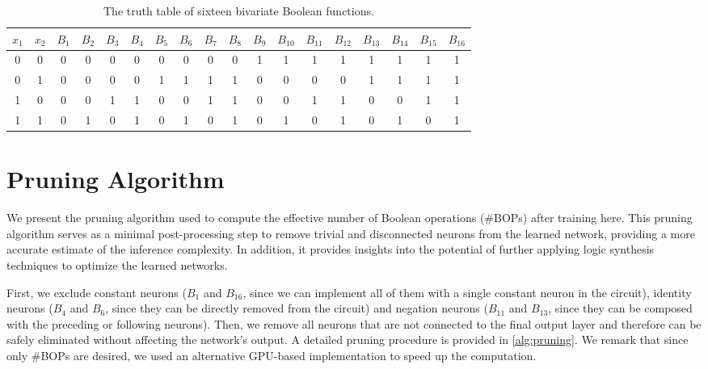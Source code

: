 \begin{table}[!htbp]
\centering
\caption{The truth table of sixteen bivariate Boolean functions.} \label{tb:all_two_input_boo_fun}
\begin{tabular}{|c|c||*{16}{c|}}
\hline
$x_1$ & $x_2$  & $B_1$ & $B_2$ & $B_3$ & $B_4$ & $B_5$ & $B_6$ & $B_7$ &
$B_8$ & $B_9$ & $B_{10}$ & $B_{11}$ & $B_{12}$ & $B_{13}$ & $B_{14}$ & $B_{15}$ & $B_{16}$ \\
\hline\hline
0 & 0 & 0 & 0 & 0 & 0 & 0 & 0 & 0 & 0 & 1 & 1 & 1 & 1 & 1 & 1 & 1 & 1 \\
\hline
0 & 1 & 0 & 0 & 0 & 0 & 1 & 1 & 1 & 1 & 0 & 0 & 0 & 0 & 1 & 1 & 1 & 1 \\
\hline
1 & 0 & 0 & 0 & 1 & 1 & 0 & 0 & 1 & 1 & 0 & 0 & 1 & 1 & 0 & 0 & 1 & 1 \\
\hline
1 & 1 & 0 & 1 & 0 & 1 & 0 & 1 & 0 & 1 & 0 & 1 & 0 & 1 & 0 & 1 & 0 & 1 \\
\hline
\end{tabular}
\end{table}



\section{Pruning Algorithm} \label{app:pruning_algorithm}

We present the pruning algorithm used to compute the effective number of Boolean operations (\#BOPs) after training here. This pruning algorithm serves as a minimal post-processing step to remove trivial and disconnected neurons from the learned network, providing a more accurate estimate of the inference complexity. In addition, it provides insights into the potential of further applying logic synthesis techniques to optimize the learned networks.

First, we exclude constant neurons (\ie $B_1$ and $B_{16}$, since we can implement all of them with a single constant neuron in the circuit), identity neurons (\ie $B_4$ and $B_6$, since they can be directly removed from the circuit) and negation neurons (\ie $ B_{11}$ and $B_{13}$, since they can be composed with the preceding or following neurons). 
Then, we remove all neurons that are not connected to the final output layer and therefore can be safely eliminated without affecting the network's output.
A detailed pruning procedure is provided in \cref{alg:pruning}. We remark that since only \#BOPs are desired, we used an alternative GPU-based implementation to speed up the computation.


